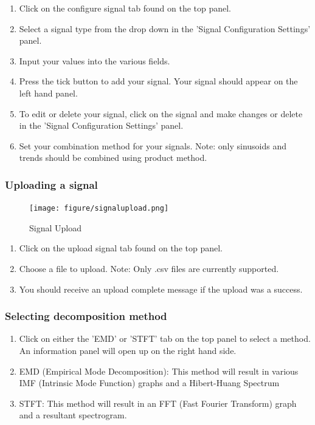 \begin{enumerate}
\item Click on the configure signal tab found on the top panel.
\item Select a signal type from the drop down in the 'Signal Configuration Settings' panel.
\item Input your values into the various fields.
\item Press the tick button to add your signal. Your signal should appear on the left hand panel.
\item To edit or delete your signal, click on the signal and make changes or delete in the 'Signal Configuration Settings' panel.
\item Set your combination method for your signals. Note: only sinusoids and trends should be combined using product method.
\end{enumerate}

\subsubsection{Uploading a signal}
\begin{figure}
\centering
\texttt{[image: figure/signalupload.png]}
\caption{\label{fig:Signal Upload}Signal Upload}
\end{figure}

\begin{enumerate}
\item Click on the upload signal tab found on the top panel.
\item Choose a file to upload. Note: Only .csv files are currently supported.
\item You should receive an upload complete message if the upload was a success.
\end{enumerate}

\subsubsection{Selecting decomposition method}
\begin{enumerate}
\item Click on either the 'EMD' or 'STFT' tab on the top panel to select a method. An information panel will open up on the right hand side.
\item EMD (Empirical Mode Decomposition): This method will result in various IMF (Intrinsic Mode Function) graphs and a Hibert-Huang Spectrum  
\item STFT: This method will result in an FFT (Fast Fourier Transform) graph and a resultant spectrogram.
\end{enumerate}

